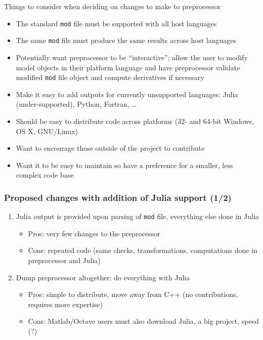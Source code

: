 \documentclass{beamer}
\begin{document}
\begin{frame}
  Things to consider when deciding on changes to make to preprocessor
  \begin{itemize}
  \item The standard \texttt{mod} file must be supported with all host languages
  \item The same \texttt{mod} file must produce the same results across host languages
  \item Potentially want preprocessor to be ``interactive''; allow the user to modify model objects in their platform language and have preprocessor validate modified \texttt{mod} file object and compute derivatives if necessary
  \item Make it easy to add outputs for currently unsupported languages: Julia (under-supported), Python, Fortran, \ldots
  \item Should be easy to distribute code across platforms (32- and 64-bit Windows, OS X, GNU/Linux)
  \item Want to encourage those outside of the project to contribute
  \item Want it to be easy to maintain so have a preference for a smaller, less complex code base
  \end{itemize}
\end{frame}

\newcommand{\asuivre}{\setcounter{sauvegardeenumi}{\theenumi}}
\newcommand{\suite}{\setcounter{enumi}{\thesauvegardeenumi}}

\begin{frame}
  \frametitle{Proposed changes with addition of Julia support (1/2)}
  \begin{enumerate}
  \item Julia output is provided upon parsing of \texttt{mod} file, everything else done in Julia
    \begin{itemize}
    \item Pros: very few changes to the preprocessor
    \item Cons: repeated code (same checks, transformations, computations done in preprocessor and Julia)
    \end{itemize}
  \item Dump preprocessor altogether: do everything with Julia
    \begin{itemize}
    \item Pros: simple to distribute, move away from C++ (no contributions, requires more expertise)
    \item Cons: Matlab/Octave users must also download Julia, a big project, speed (?)
    \end{itemize}
    \asuivre
  \end{enumerate}
\end{frame}
\end{document}

